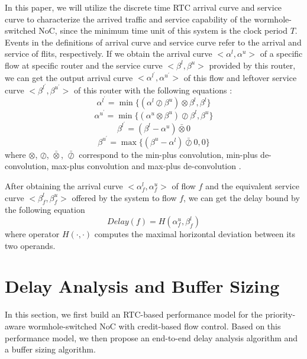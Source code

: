 \documentclass[preprint]{elsarticle}
\begin{document}
In this paper, we will utilize the discrete time RTC arrival curve and service curve to characterize the arrived traffic and service capability of the wormhole-switched NoC, since the minimum time unit of this system is the clock period $T$. Events in the definitions of arrival curve and service curve refer to the arrival and service of flits, respectively. If we obtain the arrival curve $<\alpha^l,\alpha^u>$ of a specific flow at specific router and the service curve $<\beta^l,\beta^u>$ provided by this router, we can get the output arrival curve $<\alpha^{l^\prime},\alpha^{u^\prime}>$ of this flow and leftover service curve $<\beta^{l^\prime},\beta^{u^\prime}>$ of this router with the following equations \cite{1253607}:
\begin{equation}\label{alphal}
\alpha^{l^\prime}=\min\{(\alpha^l\oslash\beta^u)\otimes\beta^l,\beta^l\}
\end{equation}
\begin{equation}\label{alphau}
\alpha^{u^\prime}=\min\{(\alpha^u\otimes\beta^u)\oslash\beta^l,\beta^u\}
\end{equation}
\begin{equation}\label{betal}
\beta^{l^\prime}=(\beta^l-\alpha^u)\bar{\otimes}0
\end{equation}
\begin{equation}\label{betau}
\beta^{u^\prime}=\max\{(\beta^u-\alpha^l)\bar{\oslash}0,0\}
\end{equation}
where $\otimes$, $\oslash$, $\bar{\otimes}$, $\bar{\oslash}$ correspond to the min-plus convolution, min-plus de-convolution, max-plus convolution and max-plus de-convolution \cite{Boudec2001Network}.

After obtaining the arrival curve $<\alpha^l_{f},\alpha^u_{f}>$ of flow $f$ and the equivalent service curve $<\beta_{f}^l,\beta_{f}^u>$ offered by the system to flow $f$, we can get the delay bound by the following equation \cite{Boudec2001Network}
\begin{equation}\label{delay}
Delay(f)=H(\alpha^u_{f},\beta^l_{f})
\end{equation}
where operator $H(\cdot,\cdot)$ computes the maximal horizontal deviation between its two operands.

\section{Delay Analysis and Buffer Sizing}\label{modeling}
In this section, we first build an RTC-based performance model for the priority-aware wormhole-switched NoC with credit-based flow control. Based on this performance model, we then propose an end-to-end delay analysis algorithm and a buffer sizing algorithm.
\end{document}
